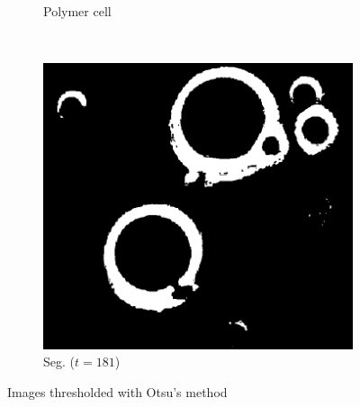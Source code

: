 \documentclass[]{article}
\begin{document}
\begin{figure}[H]
\begin{subfigure}{0.25\textwidth}
        \caption{Polymer cell}
    \end{subfigure}%
    ~
    \begin{subfigure}{0.25\textwidth}
        \centering
        \includegraphics[width=\textwidth]{img/polymercell-segmented}
        \caption{Seg. ($t=181$)}
    \end{subfigure}
    \caption{Images thresholded with Otsu's method}
    \label{fig:otsu}
\end{figure}
\end{document}
